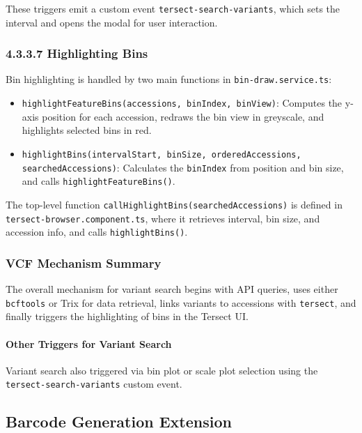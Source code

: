 \documentclass[12pt]{article}
\begin{document}
These triggers emit a custom event \texttt{tersect-search-variants}, which sets the interval and opens the modal for user interaction.

\subsubsection*{4.3.3.7 Highlighting Bins}

Bin highlighting is handled by two main functions in \texttt{bin-draw.service.ts}:

\begin{itemize}
  \item \texttt{highlightFeatureBins(accessions, binIndex, binView)}: Computes the y-axis position for each accession, redraws the bin view in greyscale, and highlights selected bins in red.
  \item \texttt{highlightBins(intervalStart, binSize, orderedAccessions, searchedAccessions)}: Calculates the \texttt{binIndex} from position and bin size, and calls \texttt{highlightFeatureBins()}.
\end{itemize}

The top-level function \texttt{callHighlightBins(searchedAccessions)} is defined in \texttt{tersect-browser.component.ts}, where it retrieves interval, bin size, and accession info, and calls \texttt{highlightBins()}.

\subsubsection*{VCF Mechanism Summary}

The overall mechanism for variant search begins with API queries, uses either \texttt{bcftools} or Trix for data retrieval, links variants to accessions with \texttt{tersect}, and finally triggers the highlighting of bins in the Tersect UI.

\paragraph{Other Triggers for Variant Search}
Variant search also triggered via bin plot or scale plot selection using the \texttt{tersect-search-variants} custom event.

\clearpage



\subsection{Barcode Generation Extension}
\end{document}
